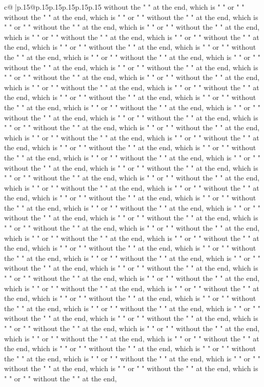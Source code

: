 \documentclass{article}
\begin{document}
{\begin{supertabular}{c@{$\;$}|p{.15\linewidth}@{}p{.15\linewidth}p{.15\linewidth}p{.15\linewidth}p{.15\linewidth}p{.15\linewidth}}
{{{without the " " at the end, which is " " or " " without the " " at the end, which is " " or " " without the " " at the end, which is " " or " " without the " " at the end, which is " " or " " without the " " at the end, which is " " or " " without the " " at the end, which is " " or " " without the " " at the end, which is " " or " " without the " " at the end, which is " " or " " without the " " at the end, which is " " or " " without the " " at the end, which is " " or " " without the " " at the end, which is " " or " " without the " " at the end, which is " " or " " without the " " at the end, which is " " or " " without the " " at the end, which is " " or " " without the " " at the end, which is " " or " " without the " " at the end, which is " " or " " without the " " at the end, which is " " or " " without the " " at the end, which is " " or " " without the " " at the end, which is " " or " " without the " " at the end, which is " " or " " without the " " at the end, which is " " or " " without the " " at the end, which is " " or " " without the " " at the end, which is " " or " " without the " " at the end, which is " " or " " without the " " at the end, which is " " or " " without the " " at the end, which is " " or " " without the " " at the end, which is " " or " " without the " " at the end, which is " " or " " without the " " at the end, which is " " or " " without the " " at the end, which is " " or " " without the " " at the end, which is " " or " " without the " " at the end, which is " " or " " without the " " at the end, which is " " or " " without the " " at the end, which is " " or " " without the " " at the end, which is " " or " " without the " " at the end, which is " " or " " without the " " at the end, which is " " or " " without the " " at the end, which is " " or " " without the " " at the end, which is " " or " " without the " " at the end, which is " " or " " without the " " at the end, which is " " or " " without the " " at the end, which is " " or " " without the " " at the end, which is " " or " " without the " " at the end, which is " " or " " without the " " at the end, which is " " or " " without the " " at the end, which is " " or " " without the " " at the end, which is " " or " " without the " " at the end, which is " " or " " without the " " at the end, which is " " or " " without the " " at the end, which is " " or " " without the " " at the end, which is " " or " " without the " " at the end, which is " " or " " without the " " at the end, which is " " or " " without the " " at the end, which is " " or " " without the " " at the end, which is " " or " " without the " " at the end, which is " " or " " without the " " at the end, which is " " or " " without the " " at the end, which is " " or " " without the " " at the end, which is " " or " " without the " " at the end, which is " " or " " without the " " at the end, which is " " or " " without the " " at the end, which is " " or " " without the " " at the end, which is " " or " " without the " " at the end, which is " " or " " without the " " at the end, which is " " or " " without the " " at the end, which is " " or " " without the " " at the end, }}}
\end{supertabular}}
\end{document}
